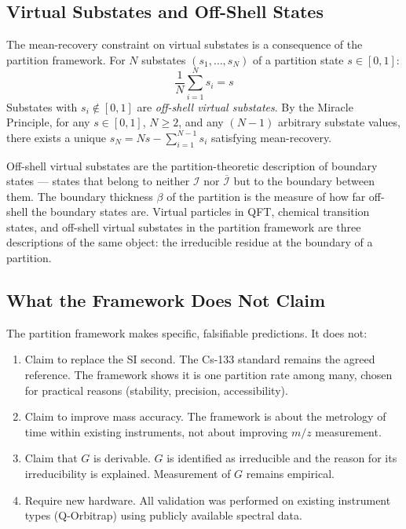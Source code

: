 \documentclass[11pt,twocolumn,a4paper]{article}
\theoremstyle{plain}
\theoremstyle{definition}
\theoremstyle{remark}
\begin{document}
\subsection{Virtual Substates and Off-Shell States}
\label{subsec:virtual}

The mean-recovery constraint on virtual substates is a consequence of the
partition framework. For $N$ substates $(s_1, \ldots, s_N)$ of a partition
state $s \in [0,1]$:
\begin{equation}
    \frac{1}{N}\sum_{i=1}^N s_i = s
    \label{eq:mean_recovery}
\end{equation}
Substates with $s_i \notin [0,1]$ are \emph{off-shell virtual substates}. By
the Miracle Principle, for any $s \in [0,1]$, $N \geq 2$, and any $(N-1)$
arbitrary substate values, there exists a unique $s_N = Ns - \sum_{i=1}^{N-1}
s_i$ satisfying mean-recovery.

Off-shell virtual substates are the partition-theoretic description of boundary
states --- states that belong to neither $\mathcal{I}$ nor $\overline{\mathcal{I}}$
but to the boundary between them. The boundary thickness $\beta$ of the
partition is the measure of how far off-shell the boundary states are. Virtual
particles in QFT, chemical transition states, and off-shell virtual substates in
the partition framework are three descriptions of the same object: the
irreducible residue at the boundary of a partition.

\subsection{What the Framework Does Not Claim}
\label{subsec:limits}

The partition framework makes specific, falsifiable predictions. It does not:
\begin{enumerate}
    \item Claim to replace the SI second. The Cs-133 standard remains the agreed
          reference. The framework shows it is one partition rate among many,
          chosen for practical reasons (stability, precision, accessibility).

    \item Claim to improve mass accuracy. The framework is about the metrology
          of time within existing instruments, not about improving $m/z$
          measurement.

    \item Claim that $G$ is derivable. $G$ is identified as irreducible and the
          reason for its irreducibility is explained. Measurement of $G$ remains
          empirical.

    \item Require new hardware. All validation was performed on existing
          instrument types (Q-Orbitrap) using publicly available spectral data.
\end{enumerate}
\end{document}
